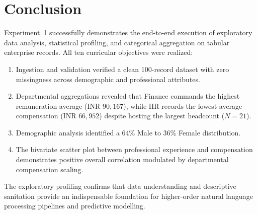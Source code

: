 \section{Conclusion}
Experiment~1 successfully demonstrates the end-to-end execution of exploratory data analysis, statistical profiling, and categorical aggregation on tabular enterprise records. All ten curricular objectives were realized:
\begin{enumerate}
    \item Ingestion and validation verified a clean 100-record dataset with zero missingness across demographic and professional attributes.
    \item Departmental aggregations revealed that Finance commands the highest remuneration average ($\text{INR } 90,167$), while HR records the lowest average compensation ($\text{INR } 66,952$) despite hosting the largest headcount ($N = 21$).
    \item Demographic analysis identified a 64\% Male to 36\% Female distribution.
    \item The bivariate scatter plot between professional experience and compensation demonstrates positive overall correlation modulated by departmental compensation scaling.
\end{enumerate}
The exploratory profiling confirms that data understanding and descriptive sanitation provide an indispensable foundation for higher-order natural language processing pipelines and predictive modelling.
